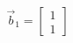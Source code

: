\documentclass[preview]{standalone}
\begin{document}
\begin{align*}
\vec{b}_1 = \begin{bmatrix} 1 \\ 1 \end{bmatrix}
\end{align*}
\end{document}

